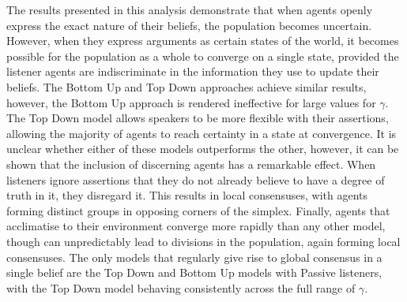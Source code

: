 The results presented in this analysis demonstrate that when agents openly express the exact nature of their beliefs, the population becomes uncertain. However, when they express arguments as certain states of the world, it becomes possible for the population as a whole to converge on a single state, provided the listener agents are indiscriminate in the information they use to update their beliefs. The Bottom Up and Top Down approaches achieve similar results, however, the Bottom Up approach is rendered ineffective for large values for $\gamma$. The Top Down model allows speakers to be more flexible with their assertions, allowing the majority of agents to reach certainty in a state at convergence. It is unclear whether either of these models outperforms the other, however, it can be shown that the inclusion of discerning agents has a remarkable effect. When listeners ignore assertions that they do not already believe to have a degree of truth in it, they disregard it. This results in local consensuses, with agents forming distinct groups in opposing corners of the simplex. Finally, agents that acclimatise to their environment converge more rapidly than any other model, though can unpredictably lead to divisions in the population, again forming local consensuses. The only models that regularly give rise to global consensus in a single belief are the Top Down and Bottom Up models with Passive listeners, with the Top Down model behaving consistently across the full range of $\gamma$. 
